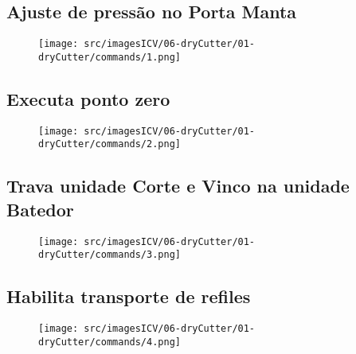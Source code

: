 \thispagestyle{fancy}
\vspace{\fill}
\subsection{Ajuste de pressão no Porta Manta}
\begin{figure}
    \centering
    \texttt{[image: src/imagesICV/06-dryCutter/01-dryCutter/commands/1.png]}
\end{figure}

\newpage
\thispagestyle{fancy}
\vspace{\fill}
\subsection{Executa ponto zero}
\begin{figure}
    \centering
    \texttt{[image: src/imagesICV/06-dryCutter/01-dryCutter/commands/2.png]}
\end{figure}

\newpage
\thispagestyle{fancy}
\vspace{\fill}
\subsection{Trava unidade Corte e Vinco na unidade Batedor}
\begin{figure}
    \centering
    \texttt{[image: src/imagesICV/06-dryCutter/01-dryCutter/commands/3.png]}
\end{figure}

\newpage
\thispagestyle{fancy}
\vspace{\fill}
\subsection{Habilita transporte de refiles}
\begin{figure}
    \centering
    \texttt{[image: src/imagesICV/06-dryCutter/01-dryCutter/commands/4.png]}
\end{figure}